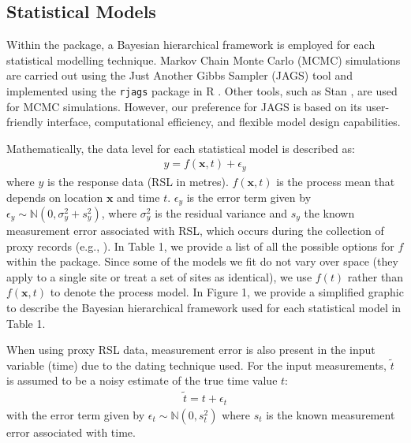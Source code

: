 \subsection{Statistical Models}\label{statisticalmodel}

Within the  package, a Bayesian hierarchical framework is employed for each statistical modelling technique. Markov Chain Monte Carlo (MCMC) simulations are carried out using the Just Another Gibbs Sampler (JAGS) tool \citep{plummer2003jags} and implemented using the \texttt{rjags} package in R \citep{plummer2016rjags}. Other tools, such as Stan \citep{carpenter2017stan}, are used for MCMC simulations. However, our preference for JAGS is based on its user-friendly interface, computational efficiency, and flexible model design capabilities.

Mathematically, the data level for each statistical model is described as:
\begin{align}
y = f(\mathbf{x},t) + \epsilon_y
\end{align}
where \(y\) is the response data (RSL in metres). \(f(\mathbf{x},t)\) is the process mean that depends on location \(\mathbf{x}\) and time \(t\). \(\epsilon_y\) is the error term given by \(\epsilon_y \sim \mathbb{N}(0, \sigma_y^2 + s_y^2)\), where \(\sigma_y^2\) is the residual variance and \(s_y\) the known measurement error associated with RSL, which occurs during the collection of proxy records (e.g., \citet{Kemp2015_SLhandbook}). In Table 1, we provide a list of all the possible options for \(f\) within the  package. Since some of the models we fit do not vary over space (they apply to a single site or treat a set of sites as identical), we use \(f(t)\) rather than \(f(\mathbf{x},t)\) to denote the process model. In Figure 1, we provide a simplified graphic to describe the Bayesian hierarchical framework used for each statistical model in Table 1.

When using proxy RSL data, measurement error is also present in the input variable (time) due to the dating technique used. For the input measurements, \(\tilde{t}\) is assumed to be a noisy estimate of the true time value \(t\):
\begin{align}
 \tilde{t} = t + \epsilon_t
\end{align}
with the error term given by \(\epsilon_t \sim \mathbb{N}(0, s_t^2)\) where \(s_t\) is the known measurement error associated with time.

